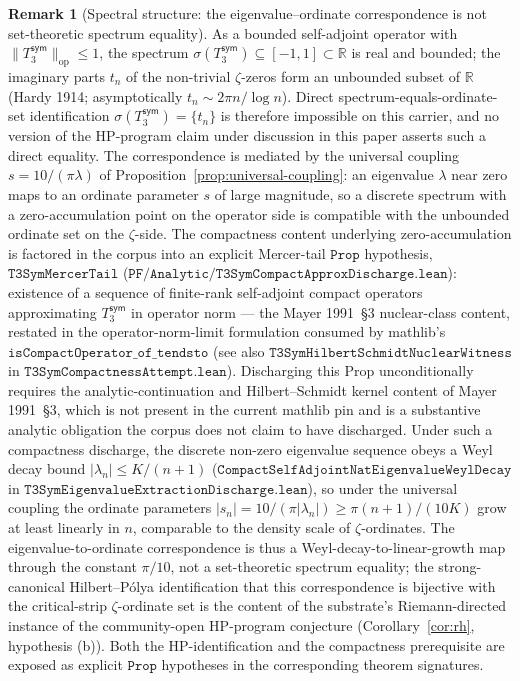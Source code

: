 \documentclass[11pt,a4paper]{amsart}
\theoremstyle{plain}
\theoremstyle{definition}
\newtheorem{remark}[theorem]{Remark}
\newcommand{\Tsym}{T_3^{\textsf{sym}}}
\begin{document}
\begin{remark}[Spectral structure: the eigenvalue--ordinate correspondence is not set-theoretic spectrum equality]\label{rem:spectral-structure-and-hp-correspondence}
As a bounded self-adjoint operator with $\|\Tsym\|_{\mathrm{op}} \le 1$, the spectrum $\sigma(\Tsym) \subseteq [-1, 1] \subset \mathbb{R}$ is real and bounded; the imaginary parts $t_{n}$ of the non-trivial $\zeta$-zeros form an unbounded subset of $\mathbb{R}$ (Hardy 1914; asymptotically $t_{n} \sim 2\pi n / \log n$). Direct spectrum-equals-ordinate-set identification $\sigma(\Tsym) = \{t_{n}\}$ is therefore impossible on this carrier, and no version of the HP-program claim under discussion in this paper asserts such a direct equality. The correspondence is mediated by the universal coupling $s = 10/(\pi\lambda)$ of Proposition~\ref{prop:universal-coupling}: an eigenvalue $\lambda$ near zero maps to an ordinate parameter $s$ of large magnitude, so a discrete spectrum with a zero-accumulation point on the operator side is compatible with the unbounded ordinate set on the $\zeta$-side. The compactness content underlying zero-accumulation is factored in the corpus into an explicit Mercer-tail $\texttt{Prop}$ hypothesis, $\texttt{T3SymMercerTail}$ ($\texttt{PF/Analytic/T3SymCompactApproxDischarge.lean}$): existence of a sequence of finite-rank self-adjoint compact operators approximating $\Tsym$ in operator norm --- the Mayer 1991~\S 3 nuclear-class content, restated in the operator-norm-limit formulation consumed by mathlib's $\texttt{isCompactOperator\_of\_tendsto}$ (see also $\texttt{T3SymHilbertSchmidtNuclearWitness}$ in $\texttt{T3SymCompactnessAttempt.lean}$). Discharging this Prop unconditionally requires the analytic-continuation and Hilbert--Schmidt kernel content of Mayer 1991~\S 3, which is not present in the current mathlib pin and is a substantive analytic obligation the corpus does not claim to have discharged. Under such a compactness discharge, the discrete non-zero eigenvalue sequence obeys a Weyl decay bound $|\lambda_{n}| \le K/(n+1)$ ($\texttt{CompactSelfAdjointNatEigenvalueWeylDecay}$ in $\texttt{T3SymEigenvalueExtractionDischarge.lean}$), so under the universal coupling the ordinate parameters $|s_{n}| = 10/(\pi |\lambda_{n}|) \ge \pi(n+1)/(10 K)$ grow at least linearly in $n$, comparable to the density scale of $\zeta$-ordinates. The eigenvalue-to-ordinate correspondence is thus a Weyl-decay-to-linear-growth map through the constant $\pi/10$, not a set-theoretic spectrum equality; the strong-canonical Hilbert--P\'olya identification that this correspondence is bijective with the critical-strip $\zeta$-ordinate set is the content of the substrate's Riemann-directed instance of the community-open HP-program conjecture (Corollary~\ref{cor:rh}, hypothesis (b)). Both the HP-identification and the compactness prerequisite are exposed as explicit $\texttt{Prop}$ hypotheses in the corresponding theorem signatures.
\end{remark}
\end{document}

